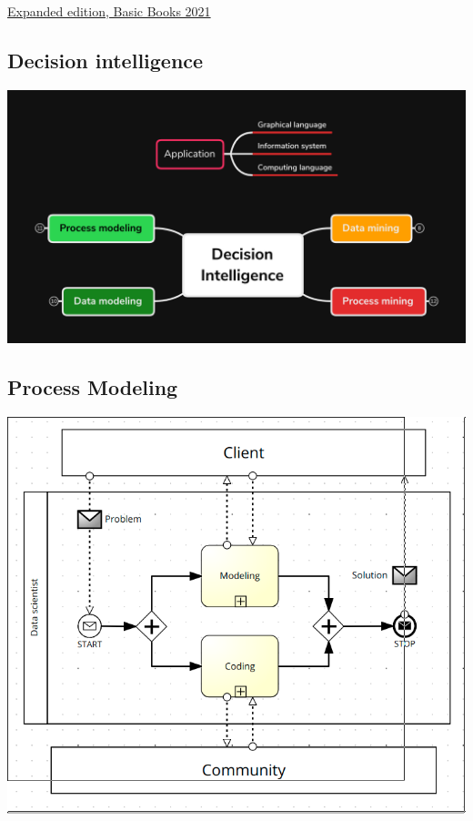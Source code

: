 \documentclass[11pt]{article}
\begin{document}
\href{https://www.amazon.com/Model-Thinker-What-Need-Know-ebook-dp-B07B8D3V9V/dp/B07B8D3V9V/}{Expanded edition, Basic Books 2021}

\subsection*{Decision intelligence}
\label{sec:orgcce1c1a}

\begin{center}
\includegraphics[width=.9\linewidth]{./img/decision_intelligence.png}
\end{center}

\subsection*{Process Modeling}
\label{sec:orgb04dd21}

\begin{center}
\includegraphics[width=.9\linewidth]{./img/bpmn.png}
\end{center}
\end{document}
